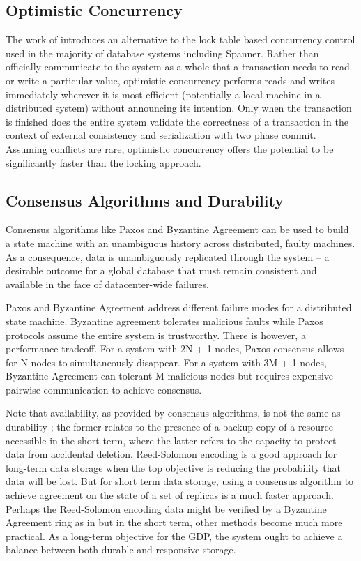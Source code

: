 \documentclass[10pt,twocolumn]{article}
\begin{document}
\subsection{Optimistic Concurrency}
The work of \cite{adya_efficient_1995} introduces an alternative to the lock table based concurrency control used in the majority of database systems including Spanner. Rather than officially communicate to the system as a whole that a transaction needs to read or write a particular value, optimistic concurrency performs reads and writes immediately wherever it is most efficient (potentially a local machine in a distributed system) without announcing its intention. Only when the transaction is finished does the entire system validate the correctness of a transaction in the context of external consistency and serialization with two phase commit. Assuming conflicts are rare, optimistic concurrency offers the potential to be significantly faster than the locking approach.


\subsection{Consensus Algorithms and Durability}

Consensus algorithms like Paxos \cite{Lamport_paxos} and Byzantine Agreement \cite{lamport_byzantine_1982} can be used to build a state machine with an unambiguous history across distributed, faulty machines. As a consequence, data is unambiguously replicated through the system -- a desirable outcome for a global database that must remain consistent and available in the face of datacenter-wide failures.

Paxos and Byzantine Agreement address different failure modes for a distributed state machine. Byzantine agreement tolerates malicious faults while Paxos protocols assume the entire system is trustworthy. There is however, a performance tradeoff. For a system with 2N + 1 nodes, Paxos consensus allows for N nodes to simultaneously disappear. For a system with 3M + 1 nodes, Byzantine Agreement can tolerant M malicious nodes but requires expensive pairwise communication to achieve consensus.  	

Note that availability, as provided by consensus algorithms,  is not the same as durability \cite{weatherspoon_antiquity:_2007}; the former relates to the presence of a backup-copy of a resource accessible in the short-term, where the latter refers to the capacity to protect data from accidental deletion. Reed-Solomon encoding \cite{Reed-Solomon}  is a good approach for long-term data storage when the top objective is reducing the probability that data will be lost. But for short term data storage, using a consensus algorithm to achieve agreement on the state of a set of replicas is a much faster approach. Perhaps the Reed-Solomon encoding data might be verified by a Byzantine Agreement ring as in \cite{rhea_pond:_2003} but in the short term, other methods become much more practical. As a long-term objective for the GDP, the system ought to achieve a balance between both durable and responsive storage.
\end{document}
